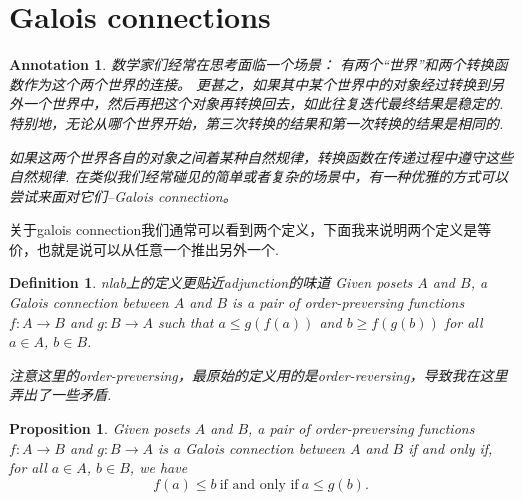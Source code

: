 \documentclass{article}
\newtheorem{proposition}[theorem]{Proposition}
\newtheorem{definition}[theorem]{Definition}
\newtheorem{annotation}[theorem]{Annotation}
\newcommand*{\xfunc}[4]{{#2}\colon{#3}{#1}{#4}}
\newcommand*{\func}[3]{\xfunc{\to}{#1}{#2}{#3}}
\begin{document}
\newpage
\section{Galois connections}

\begin{annotation}
\rm 数学家们经常在思考面临一个场景： 有两个“世界”和两个转换函数作为这个两个世界的连接。 更甚之，如果其中某个世界中的对象经过转换到另外一个世界中，然后再把这个对象再转换回去，如此往复迭代最终结果是稳定的. 特别地，无论从哪个世界开始，第三次转换的结果和第一次转换的结果是相同的. 

如果这两个世界各自的对象之间着某种自然规律，转换函数在传递过程中遵守这些自然规律. 在类似我们经常碰见的简单或者复杂的场景中，有一种优雅的方式可以尝试来面对它们--Galois connection。
\end{annotation}

关于galois connection我们通常可以看到两个定义，下面我来说明两个定义是等价，也就是说可以从任意一个推出另外一个.

\begin{definition}
\rm {\color{red} nlab上的定义更贴近adjunction的味道} Given posets $A$ and $B$, a Galois connection between $A$ and $B$ is a pair of order-preversing functions $\func{f}{A}{B}$ and $\func{g}{B}{A}$ such that $a \leq g(f(a))$ and $b \geq f(g(b))$ for all $a \in A$, $b \in B$. 

{\color{blue} 注意这里的order-preversing，最原始的定义用的是order-reversing，导致我在这里弄出了一些矛盾}.
\end{definition}


\begin{proposition}
\rm Given posets $A$ and $B$, a pair of order-preversing functions $\func{f}{A}{B}$ and $\func{g}{B}{A}$ is a Galois connection between $A$ and $B$ if and only if, for all $a \in A$, $b \in B$, we have 
$$
f(a) \leq b~\text{if and only if}~a \leq g(b).
$$
\end{proposition}
\end{document}

